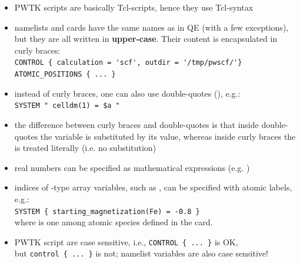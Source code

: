 \documentclass[landscape]{foils}
\begin{document}
\vspace{-1em}
\begin{itemize}
\item PWTK scripts are basically Tcl-scripts, hence they use Tcl-syntax

  \vspace{-0.5em}
\item namelists and cards have the same names as in QE (with a few
  exceptions), but they are all written in {\bf upper-case}. Their
  content is encapsulated in curly braces:\\[0.5em]
  {\codecolor\verb+CONTROL { calculation = 'scf', outdir = '/tmp/pwscf/'}+}\\
  {\codecolor\verb+ATOMIC_POSITIONS { ... }+}

  \vspace{-0.5em}
\item instead of curly braces, one can also use double-quotes
  (), e.g.:\\[0.5em]
  {\codecolor\verb+SYSTEM " celldm(1) = $a "+}

  \vspace{-0.5em}
\item the difference between curly braces  and double-quotes
   is that inside double-quotes the variable  is
  substituted by its value, whereas inside curly braces the 
  is treated literally (i.e. no substitution)

  \vspace{-0.5em}
\item real numbers can be specified as mathematical
  expressions {\small (e.g. )}
    
  \vspace{-0.5em}
\item indices of -type array variables, such as
  , can be specified with
  atomic labels, e.g.:\\[0.5em]
  {\codecolor\verb+SYSTEM { starting_magnetization(Fe) = -0.8 }+}\\[0.5em]
  where  is one among atomic species defined in the  card.

  \vspace{-0.5em}  
\item PWTK script are case sensitive, i.e.,
  {\codecolor\verb+CONTROL { ... }+} is OK,\\
  but {\codecolor\verb+control { ... }+} is not; namelist variables
  are also case sensitive!


\end{itemize}
\end{document}
